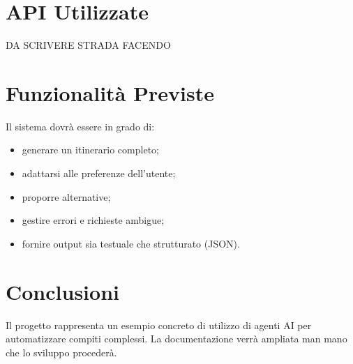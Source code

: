 \documentclass[12pt]{article}
\begin{document}
\section{API Utilizzate}
DA SCRIVERE STRADA FACENDO


\section{Funzionalità Previste}
Il sistema dovrà essere in grado di:
\begin{itemize}
    \item generare un itinerario completo;
    \item adattarsi alle preferenze dell'utente;
    \item proporre alternative;
    \item gestire errori e richieste ambigue;
    \item fornire output sia testuale che strutturato (JSON).
\end{itemize}

\section{Conclusioni}

Il progetto rappresenta un esempio concreto di utilizzo di agenti AI per automatizzare compiti complessi.  
La documentazione verrà ampliata man mano che lo sviluppo procederà.
\end{document}
